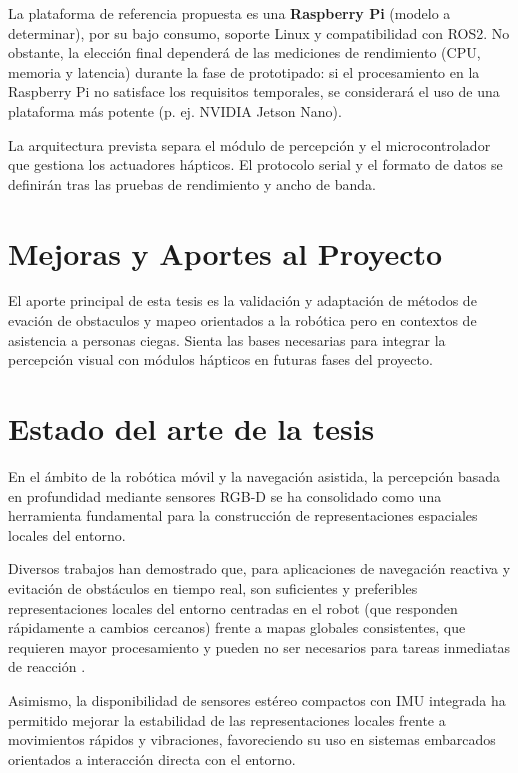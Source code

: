 La plataforma de referencia propuesta es una \textbf{Raspberry Pi} (modelo a determinar), por su bajo consumo,
soporte Linux y compatibilidad con ROS2. No obstante, la elección final dependerá de las mediciones de rendimiento
(CPU, memoria y latencia) durante la fase de prototipado: si el procesamiento en la Raspberry Pi no satisface los
requisitos temporales, se considerará el uso de una plataforma más potente (p. ej. NVIDIA Jetson Nano).

La arquitectura prevista separa el módulo de percepción y el microcontrolador que gestiona los actuadores hápticos.
El protocolo serial y el formato de datos se definirán tras las pruebas de rendimiento y ancho de banda.

\section{Mejoras y Aportes al Proyecto}

El aporte principal de esta tesis es la validación y adaptación de métodos de evación de obstaculos y mapeo
orientados a la robótica pero en contextos de asistencia a personas ciegas. Sienta las bases necesarias para
integrar la percepción visual con módulos hápticos en futuras fases del proyecto.

\section{Estado del arte de la tesis}

En el ámbito de la robótica móvil y la navegación asistida, la percepción basada en profundidad mediante sensores RGB-D
se ha consolidado como una herramienta fundamental para la construcción de representaciones espaciales locales del entorno.

Diversos trabajos han demostrado que, para aplicaciones de navegación reactiva y evitación de obstáculos en tiempo real,
son suficientes y preferibles representaciones locales del entorno centradas en el robot (que responden rápidamente a
cambios cercanos) frente a mapas globales consistentes, que requieren mayor procesamiento y pueden no ser necesarios
para tareas inmediatas de reacción \cite{brock1999high}.

Asimismo, la disponibilidad de sensores estéreo compactos con IMU integrada ha permitido mejorar la estabilidad de las
representaciones locales frente a movimientos rápidos y vibraciones, favoreciendo su uso en sistemas embarcados orientados
a interacción directa con el entorno.

